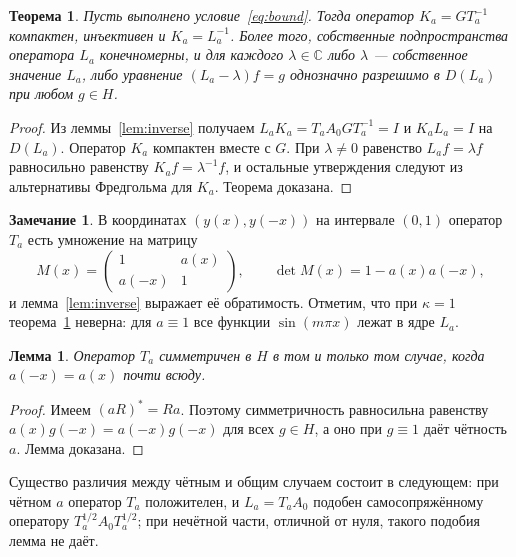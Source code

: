 \documentclass[12pt,a4paper]{article}
\newtheorem{theorem}{Теорема}
\newtheorem{lemma}{Лемма}
\theoremstyle{definition}
\newtheorem{remark}{Замечание}
\renewcommand{\C}{\mathbb C}
\begin{document}
\begin{theorem}\label{th:class}
Пусть выполнено условие~\eqref{eq:bound}. Тогда оператор $K_a=GT_a^{-1}$ компактен,
инъективен и $K_a=L_a^{-1}$. Более того, собственные подпространства оператора $L_a$
конечномерны, и для каждого $\lambda\in\C$ либо $\lambda$ --- собственное значение $L_a$,
либо уравнение $(L_a-\lambda)f=g$ однозначно разрешимо в $D(L_a)$ при любом $g\in H$.
\end{theorem}
\begin{proof}
Из леммы~\ref{lem:inverse} получаем $L_aK_a=T_aA_0GT_a^{-1}=I$ и $K_aL_a=I$ на
$D(L_a)$. Оператор $K_a$ компактен вместе с $G$. При $\lambda\ne0$ равенство
$L_af=\lambda f$ равносильно равенству $K_af=\lambda^{-1}f$, и остальные утверждения
следуют из альтернативы Фредгольма для $K_a$. Теорема доказана.
\end{proof}

\begin{remark}\label{rem:matrix}
В координатах $(y(x),y(-x))$ на интервале $(0,1)$ оператор $T_a$ есть умножение на
матрицу
\[
 M(x)=\begin{pmatrix}1&a(x)\\a(-x)&1\end{pmatrix},\qquad\det M(x)=1-a(x)a(-x),
\]
и лемма~\ref{lem:inverse} выражает её обратимость. Отметим, что при $\kappa=1$
теорема~\ref{th:class} неверна: для $a\equiv1$ все функции $\sin(m\pi x)$ лежат в ядре
$L_a$.
\end{remark}

\begin{lemma}\label{lem:sym}
Оператор $T_a$ симметричен в $H$ в том и только том случае, когда $a(-x)=a(x)$ почти
всюду.
\end{lemma}
\begin{proof}
Имеем $(aR)^*=Ra$. Поэтому симметричность равносильна равенству
$a(x)g(-x)=a(-x)g(-x)$ для всех $g\in H$, а оно при $g\equiv1$ даёт чётность $a$.
Лемма доказана.
\end{proof}
Существо различия между чётным и общим случаем состоит в следующем: при чётном $a$
оператор $T_a$ положителен, и $L_a=T_aA_0$ подобен самосопряжённому оператору
$T_a^{1/2}A_0T_a^{1/2}$; при нечётной части, отличной от нуля, такого подобия лемма не
даёт.
\end{document}
